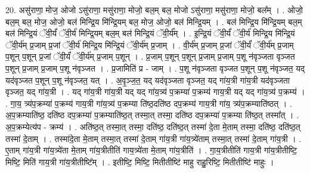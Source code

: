 \documentclass[17pt]{extarticle}
\begin{document}
20. असु॑राणा॒ मोज॒ ओजो ऽसु॑राणा॒ मसु॑राणा॒ मोजो॒ बल॒म् बल॒ मोजो ऽसु॑राणा॒ मसु॑राणा॒ मोजो॒ बल᳚म् । . ओजो॒ बल॒म् बल॒ मोज॒ ओजो॒ बल॑ मिन्द्रि॒य मि॑न्द्रि॒यम् बल॒ मोज॒ ओजो॒ बल॑ मिन्द्रि॒यम् । . बल॑ मिन्द्रि॒य मि॑न्द्रि॒यम् बल॒म् बल॑ मिन्द्रि॒यं ॅवी॒र्यं॑ ॅवी॒र्य॑ मिन्द्रि॒यम् बल॒म् बल॑ मिन्द्रि॒यं ॅवी॒र्य᳚म् । . इ॒न्द्रि॒यं ॅवी॒र्यं॑ ॅवी॒र्य॑ मिन्द्रि॒य मि॑न्द्रि॒यं ॅवी॒र्य॑म् प्र॒जाम् प्र॒जां ॅवी॒र्य॑ मिन्द्रि॒य मि॑न्द्रि॒यं ॅवी॒र्य॑म् प्र॒जाम् । . वी॒र्य॑म् प्र॒जाम् प्र॒जां ॅवी॒र्यं॑ ॅवी॒र्य॑म् प्र॒जाम् प॒शून् प॒शून् प्र॒जां ॅवी॒र्यं॑ ॅवी॒र्य॑म् प्र॒जाम् प॒शून् । . प्र॒जाम् प॒शून् प॒शून् प्र॒जाम् प्र॒जाम् प॒शू न॑वृञ्जता वृञ्जत प॒शून् प्र॒जाम् प्र॒जाम् प॒शू न॑वृञ्जत । . प्र॒जामिति॑ प्र - जाम् । . प॒शू न॑वृञ्जता वृञ्जत प॒शून् प॒शू न॑वृञ्जत॒ यद् यद॑वृञ्जत प॒शून् प॒शू न॑वृञ्जत॒ यत् । . अ॒वृ॒ञ्ज॒त॒ यद् यद॑वृञ्जता वृञ्जत॒ यद् गा॑य॒त्री गा॑य॒त्री यद॑वृञ्जता वृञ्जत॒ यद् गा॑य॒त्री । . यद् गा॑य॒त्री गा॑य॒त्री यद् यद् गा॑य॒त्र्य॑ प॒क्रम्या॑ प॒क्रम्य॑ गाय॒त्री यद् यद् गा॑य॒त्र्य॑ प॒क्रम्य॑ । . गा॒य॒ त्र्य॑प॒क्रम्या॑ प॒क्रम्य॑ गाय॒त्री गा॑य॒त्र्य॑ प॒क्रम्या ति॑ष्ठ॒दति॑ष्ठ दप॒क्रम्य॑ गाय॒त्री गा॑य॒ त्र्य॑प॒क्रम्याति॑ष्ठत् । . अ॒प॒क्रम्याति॑ष्ठ॒ दति॑ष्ठ दप॒क्रम्या॑ प॒क्रम्याति॑ष्ठ॒त् तस्मा॒त् तस्मा॒ दति॑ष्ठ दप॒क्रम्या॑ प॒क्रम्या ति॑ष्ठ॒त् तस्मा᳚त् । . अ॒प॒क्रम्येत्य॑प - क्रम्य॑ । . अति॑ष्ठ॒त् तस्मा॒त् तस्मा॒ दति॑ष्ठ॒ दति॑ष्ठ॒त् तस्मा॑ दे॒ता मे॒ताम् तस्मा॒ दति॑ष्ठ॒ दति॑ष्ठ॒त् तस्मा॑ दे॒ताम् । . तस्मा॑दे॒ता मे॒ताम् तस्मा॒त् तस्मा॑ दे॒ताम् गा॑य॒त्री गा॑य॒त्र्ये॑ताम् तस्मा॒त् तस्मा॑ दे॒ताम् गा॑य॒त्री । . ए॒ताम् गा॑य॒त्री गा॑य॒त्र्ये॑ता मे॒ताम् गा॑य॒त्रीतीति॑ गाय॒त्र्ये॑ता मे॒ताम् गा॑य॒त्रीति॑ । . गा॒य॒त्रीतीति॑ गाय॒त्री गा॑य॒त्रीतीष्टि॒ मिष्टि॒ मिति॑ गाय॒त्री गा॑य॒त्रीतीष्टि᳚म् । . इतीष्टि॒ मिष्टि॒ मितीतीष्टि॑ माहु राहु॒रिष्टि॒ मितीतीष्टि॑ माहुः । \newline
\end{document}
